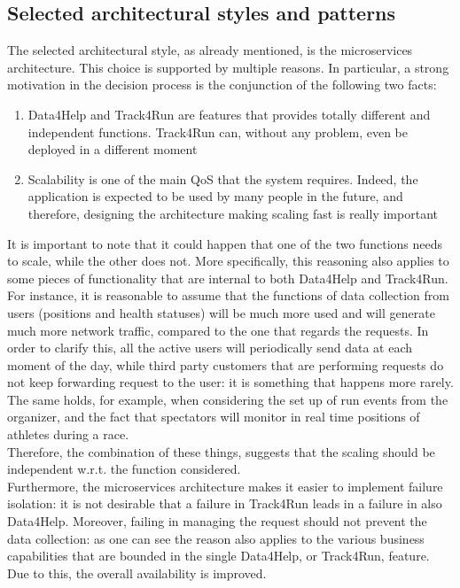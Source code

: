 \subsection{Selected architectural styles and patterns}
The selected architectural style, as already mentioned, is the microservices architecture. This choice is
supported by multiple reasons. In particular, a strong motivation in the decision process is the
conjunction of the following two facts:
\begin{enumerate}
\item Data4Help and Track4Run are features that provides totally different and independent functions.
Track4Run can, without any problem, even be deployed in a different moment
\item Scalability is one of the main QoS that the system requires. Indeed, the application is expected to
be used by many people in the future, and therefore, designing the architecture making scaling fast is
really important
\end{enumerate}
It is important to note that it could happen that one of the two functions needs to scale, while
the other does not. 
More specifically, this reasoning also applies to some pieces of functionality that
are internal to both Data4Help and Track4Run. 
For instance, it is reasonable to assume that the functions of data collection from users (positions and
health statuses) will be much more used and will generate much more network traffic, compared to the one
that regards the requests. 
In order to clarify this, all the active users will periodically send data at each moment of the day,
while third party customers that are performing requests do not keep forwarding request to the user: it is
something that happens more rarely. 
The same holds, for example, when considering the set up of run events from the organizer, and the fact
that spectators will monitor in real time positions of athletes during a race. \\ 
Therefore, the combination of these things, suggests that the scaling should be independent w.r.t. the
function considered. \\
Furthermore, the microservices architecture makes it easier to implement failure isolation: it is not
desirable that a failure in Track4Run leads in a failure in also Data4Help. 
Moreover, failing in managing the request should not prevent the data collection: as one can see the
reason also applies to the various business capabilities that are bounded in the single Data4Help, or
Track4Run, feature.  
Due to this, the overall availability is improved. \\
